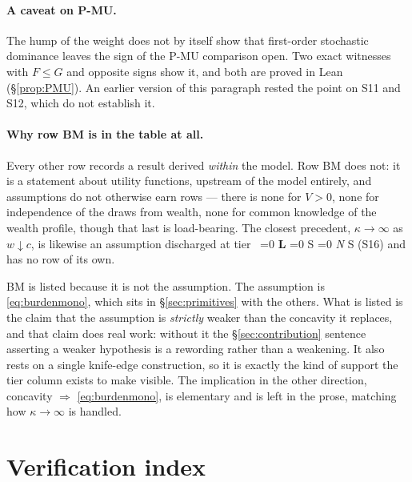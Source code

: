 \documentclass[11pt]{article}
\newcommand{\tier}[1]{%
  \ifnum\pdfstrcmp{#1}{L}=0 \textbf{L}%
  \else\ifnum\pdfstrcmp{#1}{S}=0 S%
  \else\ifnum\pdfstrcmp{#1}{N}=0 \emph{N}%
  \else #1\fi\fi\fi}
\begin{document}
\paragraph{A caveat on P-MU.} The hump of the weight does not by itself show
that first-order stochastic dominance leaves the sign of the P-MU comparison
open. Two exact witnesses with $F\le G$ and opposite signs show it, and both are
proved in Lean (\S\ref{prop:PMU}). An earlier version of this paragraph rested
the point on S11 and S12, which do not establish it.

\paragraph{Why row BM is in the table at all.} Every other row records a
result derived \emph{within} the model. Row BM does not: it is a statement
about utility functions, upstream of the model entirely, and assumptions do
not otherwise earn rows --- there is none for $V>0$, none for independence of
the draws from wealth, none for common knowledge of the wealth profile, though
that last is load-bearing. The closest precedent, $\kappa\to\infty$ as
$w\downarrow c$, is likewise an assumption discharged at tier~\tier{S} (S16)
and has no row of its own.

BM is listed because it is not the assumption. The assumption is
\eqref{eq:burdenmono}, which sits in \S\ref{sec:primitives} with the others.
What is listed is the claim that the assumption is \emph{strictly} weaker than
the concavity it replaces, and that claim does real work: without it the
\S\ref{sec:contribution} sentence asserting a weaker hypothesis is a rewording
rather than a weakening. It also rests on a single knife-edge construction, so
it is exactly the kind of support the tier column exists to make visible. The
implication in the other direction, concavity $\Rightarrow$
\eqref{eq:burdenmono}, is elementary and is left in the prose, matching how
$\kappa\to\infty$ is handled.

\section{Verification index}
\end{document}
